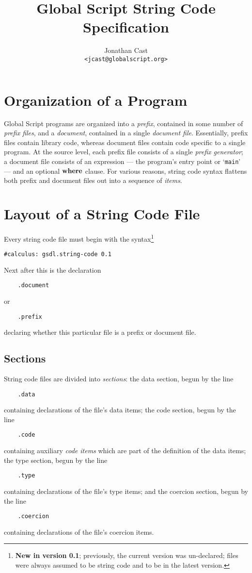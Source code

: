 \documentclass{report}
\title{Global Script String Code Specification}
\author{Jonathan Cast\\\texttt{<jcast@globalscript.org>}}
\newcommand\ccode[1]{\texttt{#1}}
\newcommand\new[2]{\footnote{\textbf{New in version #1}; previously, #2}}
\begin{document}
\maketitle

\tableofcontents

\chapter{Organization of a Program}

Global Script programs are organized into a \emph{prefix},
contained in some number of \emph{prefix files},
 and a \emph{document}, contained in a single \emph{document file}.
Essentially, prefix files contain library code, whereas document files contain code specific to a single program.
At the source level, each prefix file consists of a single \emph{prefix generator};
a document file consists of an expression
--- the program's entry point or `\ccode{main}' ---
and an optional $\mathbf{where}$ clause.
For various reasons, string code syntax flattens both prefix and document files out into a sequence of \emph{items}.

\chapter{Layout of a String Code File}

Every string code file must begin with the syntax\new{0.1}{the current version was un-declared; files were always assumed to be string code and to be in the latest version.}
\begin{verbatim}
#calculus: gsdl.string-code 0.1
\end{verbatim}

Next after this is the declaration
\begin{verbatim}
	.document
\end{verbatim}
or
\begin{verbatim}
	.prefix
\end{verbatim}
declaring whether this particular file is a prefix or document file.

\section{Sections}

String code files are divided into \emph{sections}:
the data section, begun by the line
\begin{verbatim}
	.data
\end{verbatim}
containing declarations of the file's data items;
the code section, begun by the line
\begin{verbatim}
	.code
\end{verbatim}
containing auxiliary \emph{code items} which are part of the definition of the data items;
the type section, begun by the line
\begin{verbatim}
	.type
\end{verbatim}
containing declarations of the file's type items;
and the coercion section, begun by the line
\begin{verbatim}
	.coercion
\end{verbatim}
containing declarations of the file's coercion items.
\end{document}
